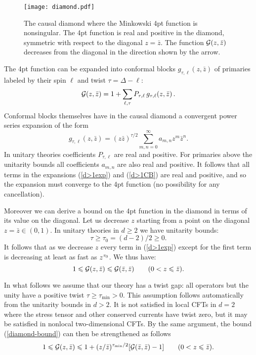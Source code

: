 \documentclass[12pt]{article}
\newcommand{\reef}[1]{(\ref{#1})}
\newcommand{\beq}{\begin{equation}}
\newcommand{\eeq}{\end{equation}}
\def\calG {{\cal G}}
\def\ge{\geqslant}
\def\le{\leqslant}
\numberwithin{equation}{section}
\begin{document}
\begin{figure}
\centering
\texttt{[image: diamond.pdf]}
\caption{The causal diamond where the Minkowski 4pt function is nonsingular. The 4pt function is real and positive in the diamond, symmetric with respect to the diagonal $z=\bar z$. The function $\calG(z,\bar z)$ decreases from the diagonal in the direction shown by the arrow.}
\label{diamond}
\end{figure}

The 4pt function can be expanded into conformal blocks $g_{\tau,\ell}(z,\bar z)$ of primaries labeled by their spin $\ell$ and twist $\tau=\Delta-\ell$:
\beq
\label{d>1exp}
\calG(z,\bar z)=1+\sum_{\ell,\tau} P_{\tau,\ell}\, g_{\tau,\ell}(z,\bar z)\,.
\eeq
Conformal blocks themselves have in the causal diamond a convergent power series expansion of the form
\beq
\label{d>1CB}
g_{\tau,\ell}(z,\bar z) = (z\bar z)^{\tau/2}\sum_{m,n=0}^\infty a_{m,n} z^{m} {\bar z}^{n}.
\eeq
In unitary theories coefficients $P_{\tau,\ell}$ are real and positive. For primaries above the unitarity bounds all coefficients $a_{m,n}$ are also real and positive. It follows that all terms in the expansions \reef{d>1exp} and \reef{d>1CB} are real and positive, and so the expansion must converge to the 4pt function (no possibility for any cancellation).

Moreover we can derive a bound on the 4pt function in the diamond in terms of its value on the diagonal. Let us decrease $z$ starting from a point on the diagonal $z=\bar z \in (0,1)$. In unitary theories in $d\ge 2$ we have unitarity bounds:
 \beq
 \tau \ge \tau_{0}=(d-2)/2\ge 0.
 \eeq
It follows that as we decrease $z$ every term in \reef{d>1exp} except for the first term is decreasing at least as fast as $z^{\rm \tau_0}$. We thus have:
\beq
\label{diamond-bound}
1\le \calG(z,\bar z)\le \calG(\bar z,\bar z) \qquad (0<z\le \bar z).
\eeq

In what follows we assume that our theory has a twist gap: all operators but the unity have a positive twist $\tau\ge \tau_{\min}>0$. This assumption follows automatically from the unitarity bounds in $d>2$. It is not satisfied in local CFTs in $d=2$ where the stress tensor and other conserved currents have twist zero, but it may be satisfied in nonlocal two-dimensional CFTs. By the same argument, the bound \reef{diamond-bound} can then be strengthened as follows
\beq
\label{diamond-bound1}
1\le \calG(z,\bar z)\le 1+(z/\bar z)^{\tau_{\min}/2} [\calG(\bar z,\bar z)-1] \qquad (0<z\le \bar z).
\eeq
\end{document}

